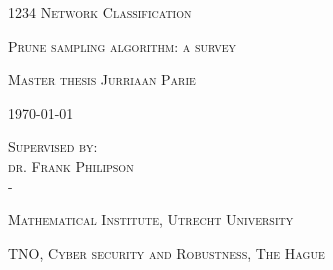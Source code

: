 \documentclass[a4paper, twoside, 11pt]{report}
\theoremstyle{plain}
\theoremstyle{definition}
\theoremstyle{remark}
\begin{document}






\begin{titlepage}
	\centering
	\vspace{1cm}

	{
		\huge
		\textsc{1234 Network Classification}
	}
	
	\vspace{0.25cm}
	
	{
		\large
		\textsc{Prune sampling algorithm: a survey}
	}

	\vspace{1.5cm}

	{
		\Large
		\textsc{Master thesis Jurriaan Parie}
	}

	\vspace{1cm}

	{
		\large
		\textsc{\today}
	}
	
		\vspace{2cm}
	
	{
		\large
		\textsc{Supervised by: \\
		dr. Frank Philipson\\
		-}
	}
	
	\vspace{3cm}
	
	{
		\large
		\textsc{Mathematical Institute, Utrecht University}
	}
		
	\vspace{0.5cm}
		
	{
		\large
		\textsc{TNO, Cyber security and Robustness, The Hague}
	}
	
	\vspace{2cm}
%	
	
\end{titlepage}


\pagestyle{plain}





\end{document}
